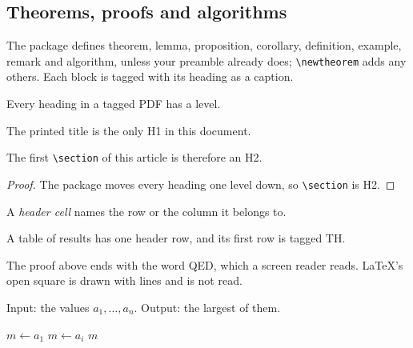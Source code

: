 \documentclass[12pt]{article}
\begin{document}
\subsection{Theorems, proofs and algorithms}
The package defines theorem, lemma, proposition, corollary, definition,
example, remark and algorithm, unless your preamble already does;
\verb|\newtheorem| adds any others. Each block is tagged with its heading as a
caption.
\begin{theorem}\label{thm:one} Every heading in a tagged PDF has a level. \end{theorem}
\begin{lemma}\label{lem:title} The printed title is the only H1 in this document. \end{lemma}
\begin{corollary} The first \verb|\section| of this article is therefore an H2. \end{corollary}
\begin{proof} The package moves every heading one level down, so \verb|\section| is H2. \end{proof}
\begin{definition} A \emph{header cell} names the row or the column it belongs to. \end{definition}
\begin{example} A table of results has one header row, and its first row is tagged TH. \end{example}
\begin{remark} The proof above ends with the word QED, which a screen reader
reads. LaTeX's open square is drawn with lines and is not read. \end{remark}
\begin{algorithm}\label{alg:max}
Input: the values $a_1,\dots,a_n$. Output: the largest of them.
\begin{algorithmic}[1]
  \State $m \gets a_1$
    \State $m \gets a_i$ \EndIf \EndFor
  \State \Return $m$
\end{algorithmic}\end{algorithm}
\end{document}
